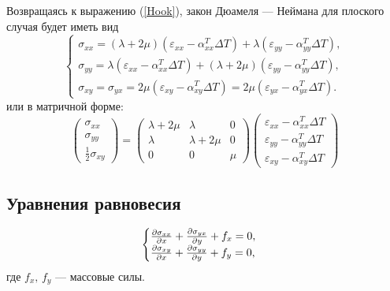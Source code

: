 \documentclass[12pt, a4paper]{article}
\begin{document}
Возвращаясь к выражению (\ref{Hook}), закон Дюамеля --- Неймана для плоского случая будет иметь вид
	\begin{equation}
	\begin{cases}
\sigma_{xx} = (\lambda+2\mu)(\varepsilon_{xx}-\alpha_{xx}^T\Delta T)+\lambda(\varepsilon_{yy}-\alpha_{yy}^T\Delta T),\\
\sigma_{yy} = \lambda(\varepsilon_{xx}-\alpha_{xx}^T\Delta T)+(\lambda+2\mu)(\varepsilon_{yy}-\alpha_{yy}^T\Delta T),\\
\sigma_{xy} =\sigma_{yx}=2\mu(\varepsilon_{xy}-\alpha_{xy}^T\Delta T)=2\mu(\varepsilon_{yx}-\alpha_{yx}^T\Delta T).
\label{Guk}
\end{cases}
	\end{equation}
	или в матричной форме:
\[
\begin{pmatrix}
	\sigma_{xx} \\
	\sigma_{yy} \\
	\frac12\sigma_{xy}
\end{pmatrix}
= 
\begin{pmatrix}
	\lambda + 2\mu & \lambda &  0 \\
	\lambda & \lambda + 2\mu & 0 \\
	0 &      0 &       \mu 
\end{pmatrix} 
\begin{pmatrix}
	\varepsilon_{xx}-\alpha_{xx}^T\Delta T \\
	\varepsilon_{yy}-\alpha_{yy}^T\Delta T \\
	\varepsilon_{xy}-\alpha_{xy}^T\Delta T
\end{pmatrix}
\]
	\subsection{Уравнения равновесия}
	\begin{equation}
			\begin{cases}
			\frac{\partial\sigma_{xx}}{\partial x}+\frac{\partial\sigma_{yx}}{\partial y}+f_x=0,\\
			\frac{\partial\sigma_{xy}}{\partial x}+\frac{\partial\sigma_{yy}}{\partial y}+f_y=0,
			\label{равновесие}
		\end{cases}
	\end{equation}
где $f_x,\,f_y$ --- массовые силы.
\end{document}
